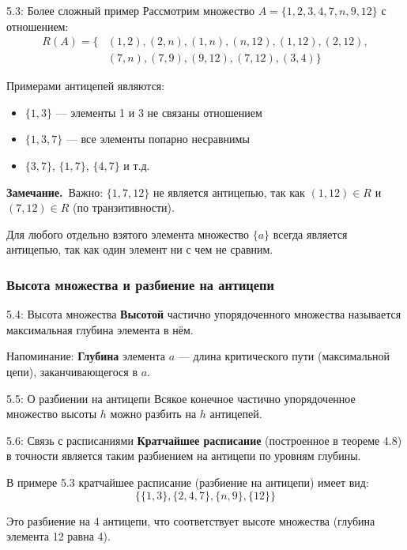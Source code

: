 \documentclass[a4paper,12pt]{article}
\newcommand{\myremark}{\textbf{Замечание.}\ }
\begin{document}
	\begin{examplebox}{5.3: Более сложный пример}
		Рассмотрим множество $A = \{1, 2, 3, 4, 7, n, 9, 12\}$ с отношением:
		\begin{align*}
			R(A) = \{ &(1, 2), (2, n), (1, n), (n, 12), (1, 12), (2, 12), \\
			&(7, n), (7, 9), (9, 12), (7, 12), (3, 4)\}
		\end{align*}
		
		Примерами антицепей являются:
		\begin{itemize}
			\item $\{1, 3\}$ — элементы 1 и 3 не связаны отношением
			\item $\{1, 3, 7\}$ — все элементы попарно несравнимы
			\item $\{3, 7\}$, $\{1, 7\}$, $\{4, 7\}$ и т.д.
		\end{itemize}
		
		\myremark{Важно:} $\{1, 7, 12\}$ не является антицепью, так как $(1,12) \in R$ и $(7,12) \in R$ (по транзитивности).
		
		Для любого отдельно взятого элемента множество $\{a\}$ всегда является антицепью, так как один элемент ни с чем не сравним.
	\end{examplebox}
	
	\subsubsection{Высота множества и разбиение на антицепи}
	
	\begin{definitionbox}{5.4: Высота множества}
		\textbf{Высотой} частично упорядоченного множества называется максимальная глубина элемента в нём.
		
		Напоминание: \textbf{Глубина} элемента $a$ — длина критического пути (максимальной цепи), заканчивающегося в $a$.
	\end{definitionbox}
	
	\begin{theorembox}{5.5: О разбиении на антицепи}
		Всякое конечное частично упорядоченное множество высоты $h$ можно разбить на $h$ антицепей.
	\end{theorembox}
	
	
	\begin{remarkbox}{5.6: Связь с расписаниями}
		\textbf{Кратчайшее расписание} (построенное в теореме 4.8) в точности является таким разбиением на антицепи по уровням глубины.
		
		В примере 5.3 кратчайшее расписание (разбиение на антицепи) имеет вид:
		\[ \{\{1, 3\}, \{2, 4, 7\}, \{n, 9\}, \{12\}\} \]
		
		Это разбиение на 4 антицепи, что соответствует высоте множества (глубина элемента 12 равна 4).
	\end{remarkbox}
	
\end{document}
